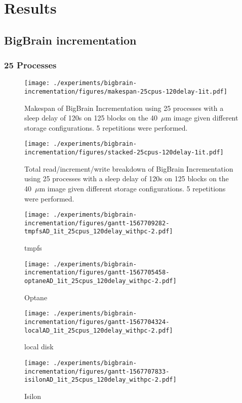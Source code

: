 \documentclass[conference]{IEEEtran}
\newcommand{\bigbrain}{BigBrain }
\begin{document}
\section{Results}

\subsection{\bigbrain incrementation}
\subsubsection{25 Processes}
\begin{figure}
    \texttt{[image: ./experiments/bigbrain-incrementation/figures/makespan-25cpus-120delay-1it.pdf]}
    \captionsetup{width=\columnwidth}
    \caption{Makespan of \bigbrain Incrementation using 25 processes with a sleep delay of 120s on 125 blocks on the 40~$\mu$m image given different storage configurations. 5 repetitions were performed.}\label{fig:makespan-25cpus}
\end{figure}
\begin{figure}
    \texttt{[image: ./experiments/bigbrain-incrementation/figures/stacked-25cpus-120delay-1it.pdf]}
    \captionsetup{width=\columnwidth}
    \caption{Total read/increment/write breakdown of \bigbrain Incrementation using 25 processes with a sleep delay of 120s on 125 blocks on the 40~$\mu$m image given different storage configurations. 5 repetitions were performed.}\label{fig:stacked-25cpus}
\end{figure}
\begin{figure*}
    \begin{subfigure}{\columnwidth}
        \centering
    \texttt{[image: ./experiments/bigbrain-incrementation/figures/gantt-1567709282-tmpfsAD\_1it\_25cpus\_120delay\_withpc-2.pdf]}
    \caption{tmpfs}
\end{subfigure}
\begin{subfigure}{\columnwidth}
        \centering
    \texttt{[image: ./experiments/bigbrain-incrementation/figures/gantt-1567705458-optaneAD\_1it\_25cpus\_120delay\_withpc-2.pdf]}
    \caption{Optane}
\end{subfigure}
\begin{subfigure}{\columnwidth}
        \centering
    \texttt{[image: ./experiments/bigbrain-incrementation/figures/gantt-1567704324-localAD\_1it\_25cpus\_120delay\_withpc-2.pdf]}
    \caption{local disk}
\end{subfigure}
\begin{subfigure}{\columnwidth}
        \centering
    \texttt{[image: ./experiments/bigbrain-incrementation/figures/gantt-1567707833-isilonAD\_1it\_25cpus\_120delay\_withpc-2.pdf]}
    \caption{Isilon}\label{fig:gantt25isilon}
\end{subfigure}
\caption{Gantt charts for each storage device (App Direct Mode) processing 125 blocks of the 40$\mu$m BigBrain using 25 processes and a sleep delay of 120s}\label{fig:gantt25}
\end{figure*}
\end{document}
